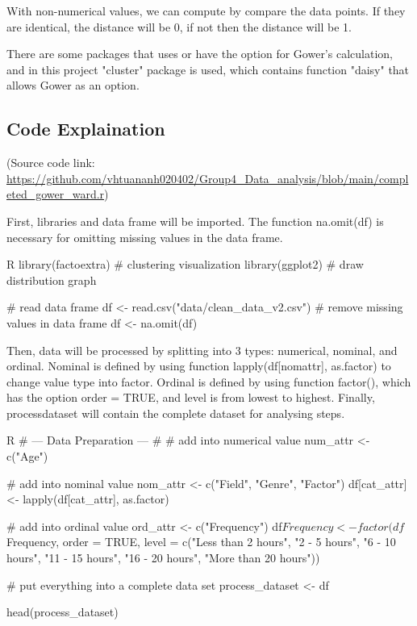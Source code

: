 With non-numerical values, we can compute by compare the data points. If they are identical, the distance will be 0, if not then the distance will be 1.

There are some packages that uses or have the option for Gower’s calculation, and in this project "cluster" package is used, which contains function "daisy" that allows Gower as an option.

\subsection{Code Explaination}
(Source code link: \url{https://github.com/vhtuananh020402/Group4_Data_analysis/blob/main/completed_gower_ward.r})

\vspace{1mm}
First, libraries and data frame will be imported. The function na.omit(df) is necessary for omitting missing values in the data frame.
    \begin{code}{R}
        library(factoextra)   # clustering visualization
        library(ggplot2)      # draw distribution graph

        # read data frame
        df <- read.csv("data/clean_data_v2.csv")
        # remove missing values in data frame
        df <- na.omit(df)
    \end{code}
Then, data will be processed by splitting into 3 types: numerical, nominal, and ordinal. Nominal is defined by using function lapply(df[nom\textunderscore attr], as.factor) to change value type into factor. Ordinal is defined by using function factor(), which has the option order = TRUE, and level is from lowest to highest. Finally, process\textunderscore dataset will contain the complete dataset for analysing steps.
    \begin{code}{R}
            # --- Data Preparation --- #
        # add into numerical value
        num_attr <- c("Age")

        # add into nominal value
        nom_attr <- c("Field", "Genre", "Factor")
        df[cat_attr] <- lapply(df[cat_attr], as.factor)

        # add into ordinal value
        ord_attr <- c("Frequency")
        df$Frequency <- factor(df$Frequency, 
                                    order = TRUE, 
                                    level = c("Less than 2 hours", 
                                                "2 - 5 hours", 
                                                "6 - 10 hours", 
                                                "11 - 15 hours", 
                                                "16 - 20 hours", 
                                                "More than 20 hours"))

        # put everything into a complete data set
        process_dataset <- df %

        head(process_dataset)
    \end{code}
